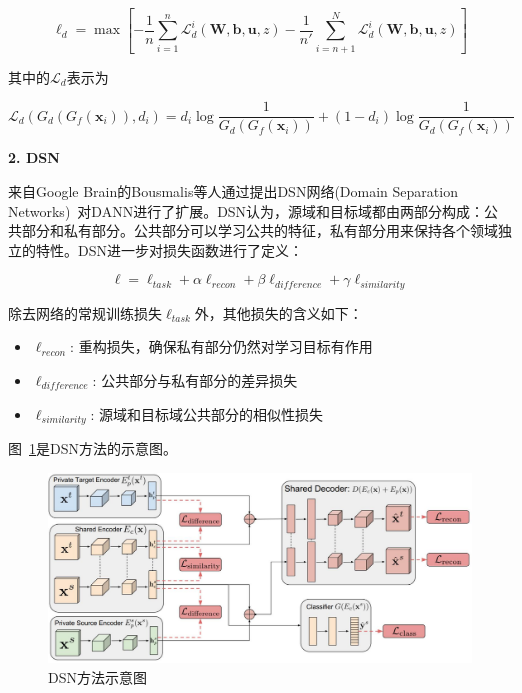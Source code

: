 \begin{equation}
	\ell_d = \max \left[-\frac{1}{n} \sum_{i=1}^{n} \mathcal{L}^i_d(\mathbf{W},\mathbf{b},\mathbf{u},z) - \frac{1}{n'} \sum_{i=n+1}^{N} \mathcal{L}^i_d(\mathbf{W},\mathbf{b},\mathbf{u},z)\right]
\end{equation}

其中的$\mathcal{L}_d$表示为

\begin{equation}
	\mathcal{L}_d(G_d(G_f(\mathbf{x}_i)),d_i) = d_i \log \frac{1}{G_d(G_f(\mathbf{x}_i))} + (1 - d_i) \log \frac{1}{G_d(G_f(\mathbf{x}_i))}
\end{equation}

\textbf{2. DSN}

来自Google Brain的Bousmalis等人通过提出DSN网络(Domain Separation Networks)~\cite{bousmalis2016domain}对DANN进行了扩展。DSN认为，源域和目标域都由两部分构成：公共部分和私有部分。公共部分可以学习公共的特征，私有部分用来保持各个领域独立的特性。DSN进一步对损失函数进行了定义：

\begin{equation}
	\ell = \ell_{task} + \alpha \ell_{recon} + \beta \ell_{difference} + \gamma \ell_{similarity}
\end{equation}

除去网络的常规训练损失$\ell_{task}$外，其他损失的含义如下：
\begin{itemize}
	\item $\ell_{recon}$: 重构损失，确保私有部分仍然对学习目标有作用
	\item $\ell_{difference}$: 公共部分与私有部分的差异损失
	\item $\ell_{similarity}$: 源域和目标域公共部分的相似性损失
\end{itemize}

图~\ref{fig-deep-dsn}是DSN方法的示意图。

\begin{figure}[htbp]
	\centering
	\includegraphics[scale=0.32]{./figures/fig-deep-dsn.pdf}
	\caption{DSN方法示意图}
	\label{fig-deep-dsn}
\end{figure}

